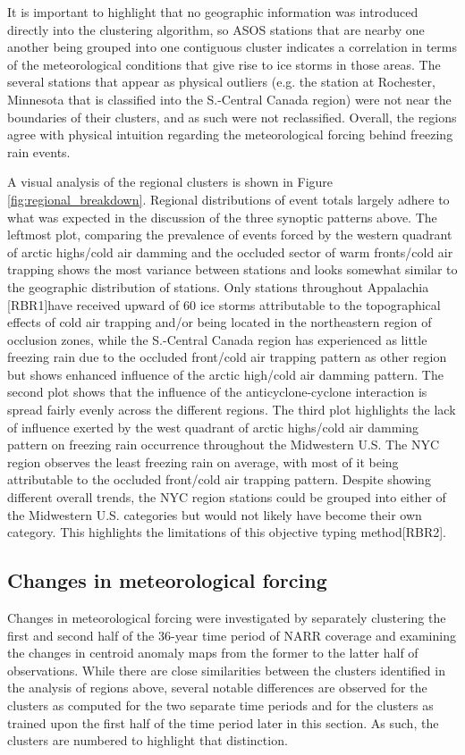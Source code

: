 \documentclass[twocol]{ametsoc}
\begin{document}
It is important to highlight that no geographic information was introduced directly into the clustering algorithm, so ASOS stations that are nearby one another being grouped into one contiguous cluster indicates a correlation in terms of the meteorological conditions that give rise to ice storms in those areas. The several stations that appear as physical outliers (e.g. the station at Rochester, Minnesota that is classified into the S.-Central Canada region) were not near the boundaries of their clusters, and as such were not reclassified. Overall, the regions agree with physical intuition regarding the meteorological forcing behind freezing rain events. 

A visual analysis of the regional clusters is shown in Figure \ref{fig:regional_breakdown}. Regional distributions of event totals largely adhere to what was expected in the discussion of the three synoptic patterns above. The leftmost plot, comparing the prevalence of events forced by the western quadrant of arctic highs/cold air damming and the occluded sector of warm fronts/cold air trapping shows the most variance between stations and looks somewhat similar to the geographic distribution of stations. Only stations throughout Appalachia [RBR1]have received upward of 60 ice storms attributable to the topographical effects of cold air trapping and/or being located in the northeastern region of occlusion zones, while the S.-Central Canada region has experienced as little freezing rain due to the occluded front/cold air trapping pattern as other region but shows enhanced influence of the arctic high/cold air damming pattern. The second plot shows that the influence of the anticyclone-cyclone interaction is spread fairly evenly across the different regions. The third plot highlights the lack of influence exerted by the west quadrant of arctic highs/cold air damming pattern on freezing rain occurrence throughout the Midwestern U.S. The NYC region observes the least freezing rain on average, with most of it being attributable to the occluded front/cold air trapping pattern. Despite showing different overall trends, the NYC region stations could be grouped into either of the Midwestern U.S. categories but would not likely have become their own category. This highlights the limitations of this objective typing method[RBR2].

 
\subsection{Changes in meteorological forcing}
Changes in meteorological forcing were investigated by separately clustering the first and second half of the 36-year time period of NARR coverage and examining the changes in centroid anomaly maps from the former to the  latter half of observations. While there are close similarities between the clusters identified in the analysis of regions above, several notable differences are observed for the clusters as computed for the two separate time periods and for the clusters as trained upon the first half of the time period later in this section. As such, the clusters are numbered to highlight that distinction.
\end{document}
